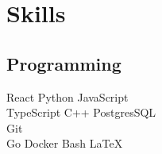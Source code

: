 \documentclass[letterpaper]{deedy-resume} %
\begin{document}
\begin{minipage}[t]{0.33\textwidth}





\section{Skills}

\subsection{Programming}

\textbullet{} React \textbullet{} Python \textbullet{} JavaScript \\
\textbullet{} TypeScript \textbullet{} C++ \textbullet{} PostgresSQL \\
\textbullet{} Git \\
\textbullet{} Go  \textbullet{} Docker \textbullet{} Bash \textbullet{} \LaTeX\


\end{minipage}
\end{document}
